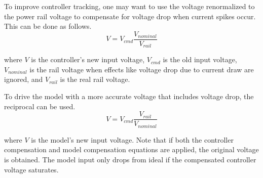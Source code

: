 To improve controller \gls{tracking}, one may want to use the voltage
renormalized to the power rail voltage to compensate for voltage drop when
current spikes occur. This can be done as follows.
\begin{equation}
  V = V_{cmd} \frac{V_{nominal}}{V_{rail}}
\end{equation}

where $V$ is the \gls{controller}'s new input voltage, $V_{cmd}$ is the old
input voltage, $V_{nominal}$ is the rail voltage when effects like voltage drop
due to current draw are ignored, and $V_{rail}$ is the real rail voltage.

To drive the \gls{model} with a more accurate voltage that includes voltage
drop, the reciprocal can be used.
\begin{equation}
  V = V_{cmd} \frac{V_{rail}}{V_{nominal}}
\end{equation}

where $V$ is the \gls{model}'s new input voltage. Note that if both the
\gls{controller} compensation and \gls{model} compensation equations are
applied, the original voltage is obtained. The \gls{model} input only drops from
ideal if the compensated \gls{controller} voltage saturates.
